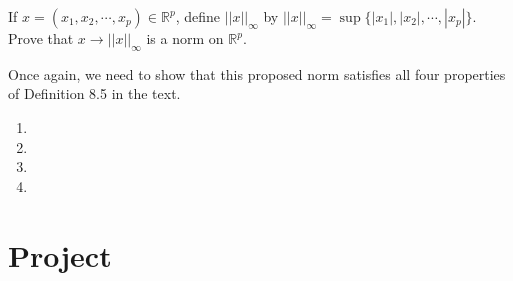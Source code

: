 \documentclass[12pt]{article}
\newenvironment{problem}[2][Problem]{\begin{trivlist}
\item[\hskip \labelsep {\bfseries #1}\hskip \labelsep {\bfseries #2.}]}{\end{trivlist}}
\begin{document}
\begin{problem}{8.G} If $x = (x_1, x_2, \cdots, x_p) \in \mathbb{R}^p$, define $||x||_{\infty}$ by $||x||_{\infty} = \sup\{|x_1|, |x_2|, \cdots, |x_p|\}$. Prove that $x \to ||x||_{\infty}$ is a norm on $\mathbb{R}^p$.
\end{problem}

Once again, we need to show that this proposed norm satisfies all four properties of Definition 8.5 in the text.

\begin{enumerate}

\item

\item

\item

\item

\end{enumerate}

\section{Project}
\end{document}
